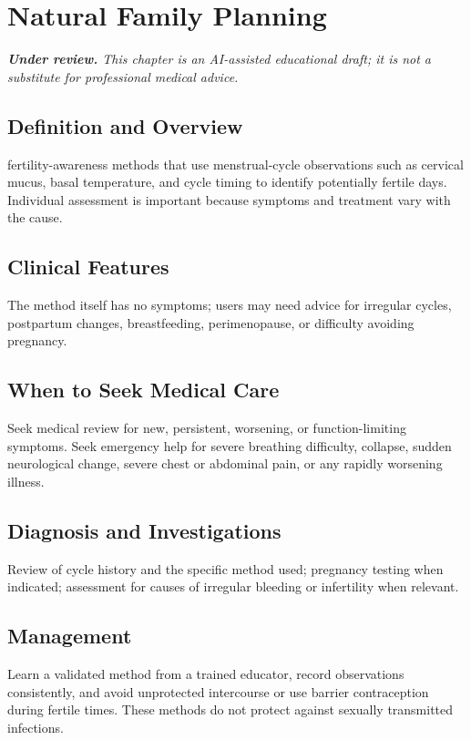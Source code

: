\chapter{Natural Family Planning}

\medskip
\noindent\textit{\textbf{Under review.} This chapter is an AI-assisted educational draft; it is not a substitute for professional medical advice.}

\section*{Definition and Overview}
fertility-awareness methods that use menstrual-cycle observations such as cervical mucus, basal temperature, and cycle timing to identify potentially fertile days. Individual assessment is important because symptoms and treatment vary with the cause.

\section*{Clinical Features}
The method itself has no symptoms; users may need advice for irregular cycles, postpartum changes, breastfeeding, perimenopause, or difficulty avoiding pregnancy.

\section*{When to Seek Medical Care}
Seek medical review for new, persistent, worsening, or function-limiting symptoms. Seek emergency help for severe breathing difficulty, collapse, sudden neurological change, severe chest or abdominal pain, or any rapidly worsening illness.

\section*{Diagnosis and Investigations}
Review of cycle history and the specific method used; pregnancy testing when indicated; assessment for causes of irregular bleeding or infertility when relevant.

\section*{Management}
Learn a validated method from a trained educator, record observations consistently, and avoid unprotected intercourse or use barrier contraception during fertile times. These methods do not protect against sexually transmitted infections.

